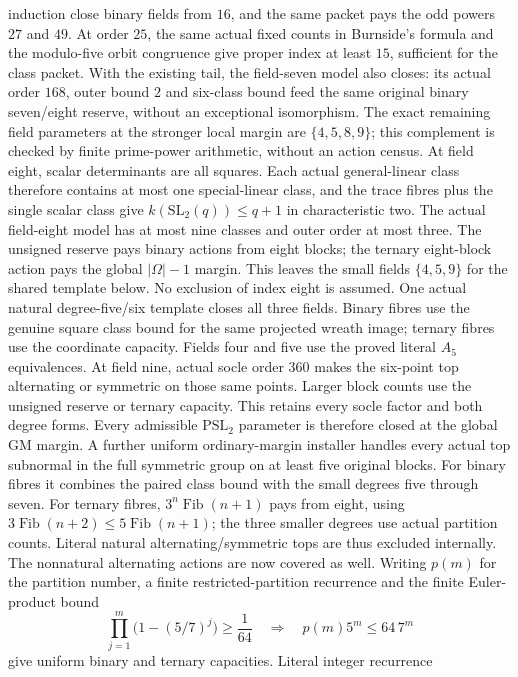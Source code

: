 induction close binary fields from $16$, and the same packet pays the
odd powers $27$ and $49$. At order $25$, the same actual fixed counts
in Burnside's formula and the modulo-five orbit congruence give proper
index at least $15$, sufficient for the class packet. With the existing
tail, the field-seven model also closes: its actual order $168$, outer
bound $2$ and six-class bound feed the same original binary seven/eight
reserve, without an exceptional isomorphism. The exact remaining field
parameters at the stronger local margin are $\{4,5,8,9\}$; this
complement is checked by finite prime-power arithmetic, without an
action census.
At field eight, scalar determinants are all squares. Each actual
general-linear class therefore contains at most one special-linear
class, and the trace fibres plus the single scalar class give
$k(\mathrm{SL}_2(q))\leq q+1$ in characteristic two. The actual
field-eight model has at most nine classes and outer order at most
three. The unsigned reserve pays binary actions from eight blocks;
the ternary eight-block action pays the global $|\Omega|-1$ margin.
This leaves the small fields $\{4,5,9\}$ for the shared template below.
No exclusion of index eight is assumed.
One actual natural degree-five/six template closes all three fields.
Binary fibres use the genuine square class bound for the same
projected wreath image; ternary fibres use the coordinate capacity.
Fields four and five use the proved literal $A_5$ equivalences.
At field nine, actual socle order $360$ makes the six-point top
alternating or symmetric on those same points. Larger block counts
use the unsigned reserve or ternary capacity. This retains every socle
factor and both degree forms. Every admissible $\mathrm{PSL}_2$
parameter is therefore closed at the global GM margin.
A further uniform ordinary-margin installer handles every actual top
subnormal in the full symmetric group on at least five original blocks.
For binary fibres it combines the paired class bound with the small
degrees five through seven. For ternary fibres,
$3^n\operatorname{Fib}(n+1)$ pays from eight, using
$3\operatorname{Fib}(n+2)\leq5\operatorname{Fib}(n+1)$; the three
smaller degrees use actual partition counts. Literal natural
alternating/symmetric tops are thus excluded internally. The nonnatural
alternating actions are now covered as well. Writing $p(m)$ for the
partition number, a finite restricted-partition recurrence and the
finite Euler-product bound
\[
 \prod_{j=1}^{m}\bigl(1-(5/7)^j\bigr)\geq\frac1{64}
 \quad\Longrightarrow\quad p(m)5^m\leq64\,7^m
\]
give uniform binary and ternary capacities. Literal integer recurrence
